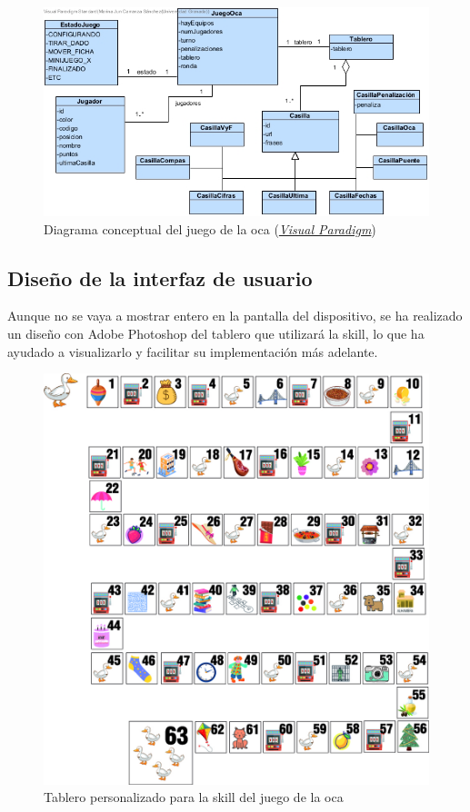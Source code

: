 \vline
\begin{figure}[H]
	\centering
	\includegraphics[width=1\textwidth]{imgs/DConcep.jpg}
	\caption{Diagrama conceptual del juego de la oca (\href{https://www.visual-paradigm.com/}{\textit{Visual Paradigm}})}
	\label{fig:DConcep-1}
\end{figure}

\newpage 

\subsection{Diseño de la interfaz de usuario}

Aunque no se vaya a mostrar entero en la pantalla del dispositivo, se ha realizado un diseño con Adobe Photoshop del tablero que utilizará la skill, lo que ha ayudado a visualizarlo y facilitar su implementación más adelante.

\begin{figure}[H]
	\centering
	\includegraphics[width=1\textwidth]{imgs/tablero-oca.jpg}
	\caption{Tablero personalizado para la skill del juego de la oca}
	\label{fig:tablero-oca}
\end{figure}
 
